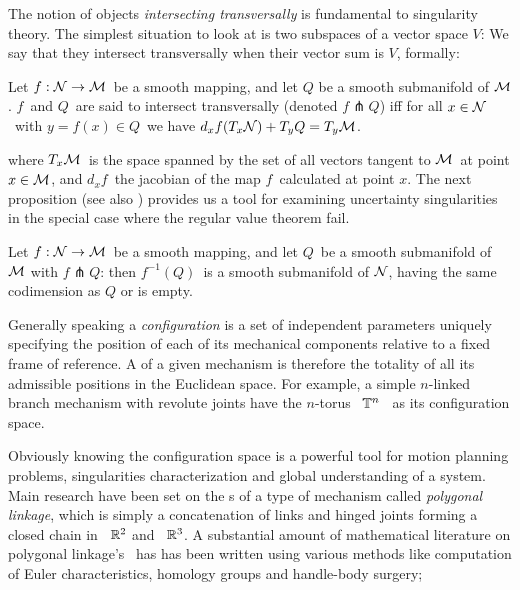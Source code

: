 The notion of objects \emph{intersecting transversally} is
fundamental to singularity theory. The simplest situation to look
at is two subspaces of a vector space $V$: We say that they
intersect transversally when their vector sum is $V$, formally:

\begin{defn}
Let $f: \mathcal{N} \to \mathcal{M}$\ be a smooth mapping, and let $Q$ be a smooth
submanifold of $\mathcal{M}$. $f$\ and $Q$\ are said to intersect
transversally (denoted $f\pitchfork Q$) iff for all $x\in\mathcal{N}$\ with
$y=f(x)\in Q$\ we have $d_xf(T_x\mathcal{N})+T_yQ=T_y\mathcal{M}$.
\end{defn}

where $T_x\mathcal{M}$\ is the space spanned by the set of all vectors
tangent to $\mathcal{M}$\ at point $x\in\mathcal{M}$, and $d_xf$\ the jacobian of
the map $f$\ calculated at point $x$. The next proposition (see
also \cite[pp31]{AGV}) provides us a tool for examining
uncertainty singularities in the special case where the regular
value theorem fail.
\begin{prop}
Let $f:\mathcal{N}\to \mathcal{M}$\ be a smooth mapping, and let $Q$\ be a smooth
submanifold of $\mathcal{M}$ with $f\pitchfork Q$: then $f^{-1}(Q)$\ is a
smooth submanifold of $\mathcal{N}$, having the same codimension as $Q$ or
is empty.
\end{prop}




Generally speaking a \emph{configuration} is a set of independent
parameters uniquely specifying the position of each of its
mechanical components relative to a fixed frame of reference. A
\emph{\cspace} of a given mechanism is therefore the totality of
all its admissible positions in the Euclidean space. For example,
a simple $n$-linked branch mechanism with revolute joints have the
$n$-torus \ $\mathbb{T}^n$ \ as its configuration space.

Obviously knowing the configuration space is a powerful tool for
motion planning problems, singularities characterization and
global understanding of a system. Main research have been set on
the \cspace s of a type of mechanism called \emph{polygonal
linkage}, which is simply a concatenation of links and hinged
joints forming a closed chain in \ ${\mathbb R}^{2}$ and \ ${\mathbb R}^{3}$. A
substantial amount of mathematical literature on polygonal
linkage's \cspace\ has has been written using various methods like
computation of Euler characteristics, homology groups and
handle-body surgery;

